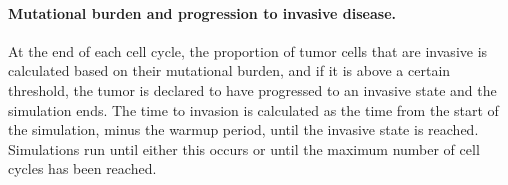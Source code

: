 \documentclass[11pt]{article}
\begin{document}
\paragraph{Mutational burden and progression to invasive disease.}
At the end of each cell cycle, the proportion of tumor cells that are invasive is calculated based on their mutational burden, and if it is above a certain threshold, the tumor is declared to have progressed to an invasive state and the simulation ends. The time to invasion is calculated as the time from the start of the simulation, minus the warmup period, until the invasive state is reached. Simulations run until either this occurs or until the maximum number of cell cycles has been reached.
\end{document}

